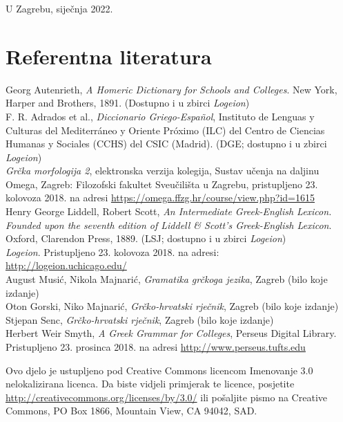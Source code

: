 \documentclass[a4paper,12pt,twoside]{report}
\begin{document}

U Zagrebu, siječnja 2022.

\section*{Referentna literatura}

Georg Autenrieth, \textit{A Homeric Dictionary for Schools and Colleges}. New York, Harper and Brothers, 1891. (Dostupno i u zbirci \textit{Logeion})\\
F. R. Adrados et al., \textit{Diccionario Griego-Español}, Instituto de Lenguas y Culturas del Mediterráneo y Oriente Próximo (ILC) del Centro de Ciencias Humanas y Sociales (CCHS) del CSIC (Madrid). (DGE; dostupno i u zbirci \textit{Logeion})\\
\textit{Grčka morfologija 2}, elektronska verzija kolegija, Sustav učenja na daljinu Omega, Zagreb: Filozofski fakultet Sveučilišta u Zagrebu, pristupljeno 23. kolovoza 2018. na adresi \url{https://omega.ffzg.hr/course/view.php?id=1615}\\
Henry George Liddell, Robert Scott, \textit{An Intermediate Greek-English Lexicon. Founded upon the seventh edition of Liddell \& Scott's Greek-English Lexicon}. Oxford, Clarendon Press, 1889. (LSJ; dostupno i u zbirci \textit{Logeion})\\
\textit{Logeion}. Pristupljeno 23. kolovoza 2018. na adresi: \\ \url{http://logeion.uchicago.edu/}\\
August Musić, Nikola Majnarić, \textit{Gramatika grčkoga jezika}, Zagreb (bilo koje izdanje)\\
Oton Gorski, Niko Majnarić, \textit{Grčko-hrvatski rječnik}, Zagreb (bilo koje izdanje)\\
Stjepan Senc, \textit{Grčko-hrvatski rječnik}, Zagreb (bilo koje izdanje)\\
Herbert Weir Smyth, \textit{A Greek Grammar for Colleges}, Perseus Digital Library. Pristupljeno 23. prosinca 2018. na adresi \url{http://www.perseus.tufts.edu}\\

\vspace*{\fill}

\noindent Ovo djelo je ustupljeno pod Creative Commons licencom Imenovanje 3.0 nelokalizirana licenca. Da biste vidjeli primjerak te licence, posjetite \url{http://creativecommons.org/licenses/by/3.0/} ili pošaljite pismo na Creative Commons, PO Box 1866, Mountain View, CA 94042, SAD.
\end{document}
